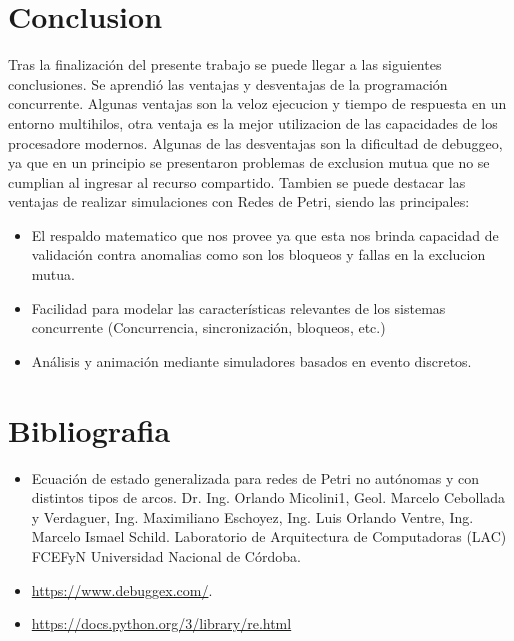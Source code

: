 \documentclass{article}
\begin{document}
\section{Conclusion}
	Tras la finalización del presente trabajo se puede llegar a las siguientes conclusiones.
	Se aprendió las ventajas y desventajas de la programación concurrente. Algunas ventajas son la veloz ejecucion y tiempo de respuesta en un entorno multihilos, otra ventaja es la mejor utilizacion de las capacidades de los procesadore modernos. Algunas de las desventajas son la dificultad de debuggeo, ya que en un principio se presentaron problemas de exclusion mutua que no se cumplian al ingresar al recurso compartido.\newline
	Tambien se puede destacar las ventajas de realizar simulaciones con Redes de Petri, siendo las principales:
	\begin{itemize}
		\item El respaldo matematico que nos provee ya que esta nos brinda capacidad de validación 
		contra anomalias como son los bloqueos y fallas en la exclucion mutua.
		\item Facilidad para modelar las características relevantes de los sistemas concurrente (Concurrencia, 
		sincronización, bloqueos, etc.)
		\item Análisis y animación mediante simuladores basados en evento discretos.
	\end{itemize}
	
\section{Bibliografia}
	\begin{itemize}
		\item Ecuación de estado generalizada para redes de Petri no autónomas y con distintos tipos de arcos. Dr. Ing. Orlando Micolini1, Geol. Marcelo Cebollada y Verdaguer, Ing. Maximiliano Eschoyez, Ing. Luis Orlando Ventre, Ing. Marcelo Ismael Schild. Laboratorio de Arquitectura de Computadoras (LAC) FCEFyN Universidad Nacional de Córdoba.
		\item \url{https://www.debuggex.com/}.
		\item \href {https://docs.python.org/3/library/re.html}{https://docs.python.org/3/library/re.html}
	\end{itemize}
\end{document}
